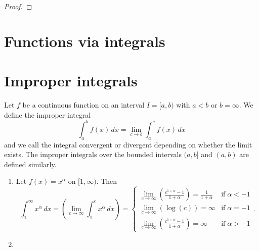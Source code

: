 \begin{proof}
\end{proof}

\section{Functions via integrals}


\section{Improper integrals}

\begin{definition}
    Let $f$ be a continuous function on an interval $I = [a, b)$ with $a < b$ or $b = \infty$. We define the improper integral \[ \int_a^b f(x) \, dx = \lim_{c \to b} \int_a^c f(x) \, dx \] and we call the integral convergent or divergent depending on whether the limit exists. The improper integrals over the bounded intervals $(a, b]$ and $(a, b)$ are defined similarly.
\end{definition}

\begin{example}
    \begin{enumerate}
        \item Let $f(x) = x^{\alpha}$ on $[1, \infty)$. Then
        \[ 
            \int_{1}^{\infty} x^{\alpha} \, dx = \left( \lim_{c \to \infty} \int^c_1 x^{\alpha} \, dx \right) =
            \begin{cases}
                \lim_{c \to \infty} \left( \frac{c^{1 + \alpha} - 1}{1 + \alpha} \right) = \frac{1}{1 + \alpha} & \text{if} \; \alpha < -1 \\
                \lim_{c \to \infty} (\log(c)) = \infty & \text{if} \; \alpha = -1 \\
                \lim_{c \to \infty} \left( \frac{c^{1 + \alpha} - 1}{1 + \alpha} \right) = \infty & \text{if} \; \alpha > -1
            \end{cases}
            .
        \]

        \item 
    \end{enumerate}
\end{example}
